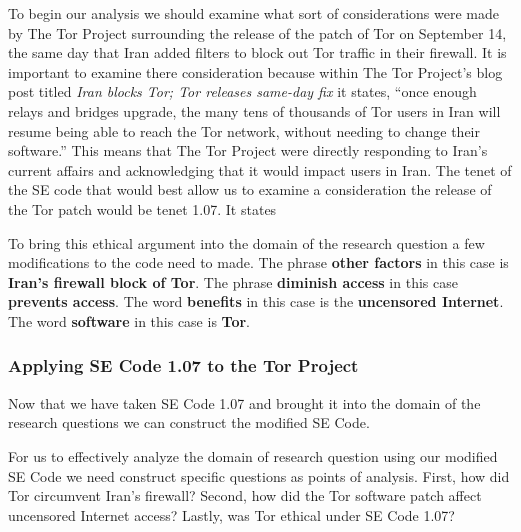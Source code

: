 \documentclass[11pt]{article}
\begin{document}
\begin{multicols}{2}
To begin our analysis we should examine what sort of considerations were made by
The Tor Project surrounding the release of the patch of Tor on September 14, the
same day that Iran added filters to block out Tor traffic in their firewall. It
is important to examine there consideration because within The Tor Project's
blog post titled \textit{Iran blocks Tor; Tor releases same-day fix} it states,
``once enough relays and bridges upgrade, the many tens of thousands of Tor
users in Iran will resume being able to reach the Tor network, without needing
to change their software.''\cite{Tor:SameDayFix} This means that The Tor Project
were directly responding to Iran's current affairs and acknowledging that it
would impact users in Iran. The tenet of the SE code that would best allow us
to examine a consideration the release of the Tor patch would be tenet 1.07. It
states
\newline
\begin{center}
\end{center}
\smallskip
To bring this ethical argument into the domain of the research question a few
modifications to the code need to made. The phrase \textbf{other factors} in
this case is \textbf{Iran's firewall block of Tor}. The phrase \textbf{diminish
access} in this case \textbf{prevents access}. The word \textbf{benefits} in
this case is the \textbf{uncensored Internet}. The word \textbf{software} in
this case is \textbf{Tor}.

\subsubsection{Applying SE Code 1.07 to the Tor Project}

Now that we have taken SE Code 1.07 and brought it into the domain of the
research questions we can construct the modified SE Code.
\newline
\begin{center}
\end{center}
\smallskip
For us to effectively analyze the domain of research question using our modified
SE Code we need construct specific questions as points of analysis. First, how
did Tor circumvent Iran's firewall?  Second, how did the Tor software patch
affect uncensored Internet access?  Lastly, was Tor ethical under SE Code 1.07?


\end{multicols}
\end{document}
